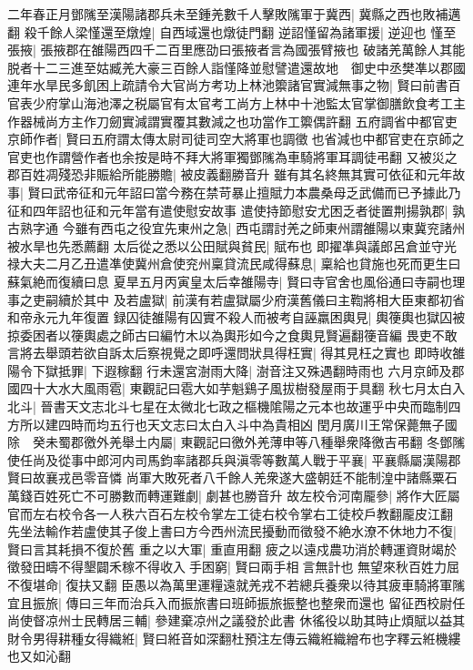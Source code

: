 二年春正月鄧隲至漢陽諸郡兵未至鍾羌數千人擊敗隲軍于冀西|{
	冀縣之西也敗補邁翻}
殺千餘人梁慬還至燉煌|{
	自西域還也燉徒門翻}
逆詔慬留為諸軍援|{
	逆迎也}
慬至張掖|{
	張掖郡在雒陽西四千二百里應劭曰張掖者言為國張臂掖也}
破諸羌萬餘人其能脱者十二三進至姑臧羌大豪三百餘人詣慬降並慰譬遣還故地　御史中丞樊凖以郡國連年水旱民多飢困上疏請令大官尚方考功上林池籞諸官實減無事之物|{
	賢曰前書百官表少府掌山海池澤之税屬官有太官考工尚方上林中十池監太官掌御膳飲食考工主作器械尚方主作刀劒實減謂實覆其數減之也功當作工籞偶許翻}
五府調省中都官吏京師作者|{
	賢曰五府謂太傳太尉司徒司空大將軍也調徵也省減也中都官吏在京師之官吏也作謂營作者也余按是時不拜大將軍獨鄧隲為車騎將軍耳調徒弔翻}
又被災之郡百姓凋殘恐非賑給所能勝贍|{
	被皮義翻勝音升}
雖有其名終無其實可依征和元年故事|{
	賢曰武帝征和元年詔曰當今務在禁苛暴止擅賦力本農桑母乏武備而已予據此乃征和四年詔也征和元年當有遣使慰安故事}
遣使持節慰安尤困乏者徙置荆揚孰郡|{
	孰古熟字通}
今雖有西屯之役宜先東州之急|{
	西屯謂討羌之師東州謂雒陽以東冀兖諸州被水旱也先悉薦翻}
太后從之悉以公田賦與貧民|{
	賦布也}
即擢凖與議郎呂倉並守光禄大夫二月乙丑遣凖使冀州倉使兖州稟貸流民咸得蘇息|{
	稟給也貸施也死而更生曰蘇氣絶而復續曰息}
夏旱五月丙寅皇太后幸雒陽寺|{
	賢曰寺官舍也風俗通曰寺嗣也理事之吏嗣續於其中}
及若盧獄|{
	前漢有若盧獄屬少府漢舊儀曰主鞫將相大臣東都初省和帝永元九年復置}
録囚徒雒陽有囚實不殺人而被考自誣羸困輿見|{
	輿箯輿也獄囚被掠委困者以箯輿處之師古曰編竹木以為輿形如今之食輿見賢遍翻箯音編}
畏吏不敢言將去舉頭若欲自訴太后察視覺之即呼還問狀具得枉實|{
	得其見枉之實也}
即時收雒陽令下獄抵罪|{
	下遐稼翻}
行未還宮澍雨大降|{
	澍音注又殊遇翻時雨也}
六月京師及郡國四十大水大風雨雹|{
	東觀記曰雹大如芋魁鷄子風拔樹發屋雨于具翻}
秋七月太白入北斗|{
	晉書天文志北斗七星在太微北七政之樞機隂陽之元本也故運乎中央而臨制四方所以建四時而均五行也天文志曰太白入斗中為貴相凶}
閏月廣川王常保薨無子國除　癸未蜀郡徼外羌舉土内屬|{
	東觀記曰徼外羌薄申等八種舉衆降徼吉弔翻}
冬鄧隲使任尚及從事中郎河内司馬鈞率諸郡兵與滇零等數萬人戰于平襄|{
	平襄縣屬漢陽郡賢曰故襄戎邑零音憐}
尚軍大敗死者八千餘人羌衆遂大盛朝廷不能制湟中諸縣粟石萬錢百姓死亡不可勝數而轉運難劇|{
	劇甚也勝音升}
故左校令河南龎參|{
	將作大匠屬官而左右校令各一人秩六百石左校令掌左工徒右校令掌右工徒校戶教翻龎皮江翻}
先坐法輸作若盧使其子俊上書曰方今西州流民擾動而徵發不絶水潦不休地力不復|{
	賢曰言其耗損不復於舊}
重之以大軍|{
	重直用翻}
疲之以遠戍農功消於轉運資財竭於徵發田疇不得墾闢禾稼不得收入手困窮|{
	賢曰兩手相言無計也}
無望來秋百姓力屈不復堪命|{
	復扶又翻}
臣愚以為萬里運糧遠就羌戎不若總兵養衆以待其疲車騎將軍隲宜且振旅|{
	傳曰三年而治兵入而振旅書曰班師振旅振整也整衆而還也}
留征西校尉任尚使督凉州士民轉居三輔|{
	參建棄凉州之議發於此書}
休徭役以助其時止煩賦以益其財令男得耕種女得織絍|{
	賢曰絍音如深翻杜預注左傳云織絍織繒布也字釋云絍機縷也又如沁翻}

